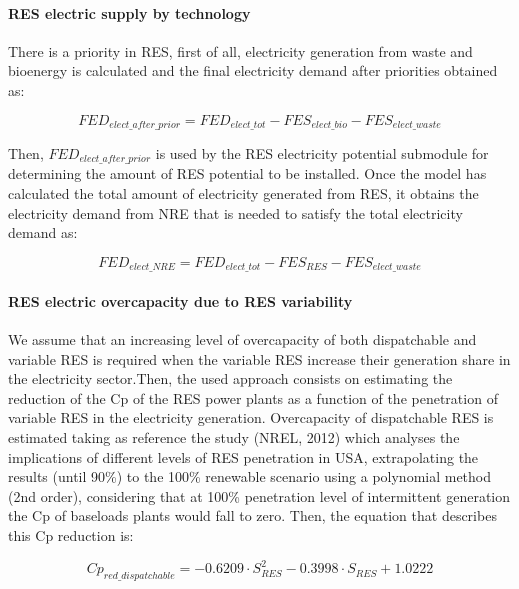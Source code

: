 \paragraph{RES electric supply by technology}

There is a priority in RES, first of all, electricity generation from waste and bioenergy is calculated and the final electricity demand after priorities obtained as:

\begin{equation}
    FED_{elect\_after\_prior}= FED_{elect\_tot}-FES_{elect\_bio}-FES_{elect\_waste}
    \label{eq:FED-after-priorities}
\end{equation}

Then, $FED_{elect\_after\_prior}$ is used by the RES electricity potential submodule for determining the amount of RES potential to be installed.
Once the model has calculated the total amount of electricity generated from RES, it obtains the electricity demand from NRE that is needed to satisfy the total electricity demand as:

\begin{equation}
    FED_{elect\_NRE}= FED_{elect\_tot}-FES_{RES}-FES_{elect\_waste}
    \label{eq:FED-elect-NRE}
\end{equation}

\paragraph{RES electric overcapacity due to RES variability}

We assume that an increasing level of overcapacity of both dispatchable and variable RES is required when the variable RES increase their generation share in the electricity sector.Then, the used approach consists on estimating the reduction of the Cp of the RES power plants as a function of the penetration of variable RES in the electricity generation.
Overcapacity of dispatchable RES is estimated taking as reference the study (NREL, 2012) which analyses the implications of different levels of RES penetration in USA, extrapolating the results (until 90\%) to the 100\% renewable scenario using a polynomial method (2nd order), considering that at 100\% penetration level of intermittent generation the Cp of baseloads plants would fall to zero. Then, the equation that describes this Cp reduction is:

\begin{equation}
    Cp_{red\_dispatchable}=-0.6209 \cdot S_{RES}^2-0.3998 \cdot S_{RES} + 1.0222
    \label{eq:cp-reduction-dispatchable}
\end{equation}

